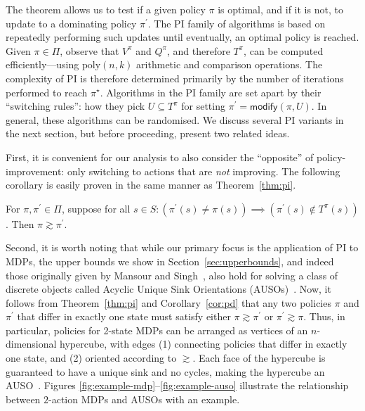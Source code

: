 The theorem allows us to test if a given policy $\pi$ is optimal, and if it is not, to update to a dominating policy $\pi^{\prime}$. The PI family of algorithms is based on repeatedly performing such updates until eventually, an optimal policy is reached. Given $\pi \in \Pi$, observe that $V^{\pi}$ and $Q^{\pi}$, and therefore $T^{\pi}$, can be computed efficiently---using $\text{poly}(n, k)$ arithmetic and comparison operations. The complexity of PI is therefore determined primarily by the number of iterations performed to reach $\pi^{\star}$. Algorithms in the PI family are set apart by their ``switching rules'': how they pick $U \subseteq T^{\pi}$  for setting $\pi^{\prime} = \textsf{modify}(\pi, U)$. In general, these algorithms can be randomised. We discuss several PI variants in the next section, but before proceeding, present two related ideas.

First, it is convenient for our analysis to also consider the ``opposite'' of policy-improvement: only switching to actions that are \textit{not} improving. The following corollary is easily proven in the same manner as Theorem~\ref{thm:pi}.

\begin{corollary}
\label{cor:pd}%
For $\pi, \pi^{\prime} \in \Pi$, suppose for all $s \in S: (\pi^{\prime}(s) \neq \pi(s)) \implies (\pi^{\prime}(s) \notin T^{\pi}(s))$. Then $\pi \gtrsim \pi^{\prime}$.
\end{corollary}

Second, it is worth noting that while our primary focus is the application of PI to MDPs, the upper bounds we show in Section~\ref{sec:upperbounds}, and indeed those originally given by Mansour and Singh~, also hold for solving a class of discrete objects called Acyclic Unique Sink Orientations (AUSOs)~\cite{Stickney+Watson:1978,Szabo+Welzl:2001}. Now, it follows from Theorem~\ref{thm:pi} and Corollary~\ref{cor:pd} that any two policies $\pi$ and $\pi^{\prime}$ that differ in exactly one state must satisfy either $\pi \gtrsim \pi^{\prime}$ or $\pi^{\prime} \gtrsim \pi$. Thus, in particular, policies for 2-state MDPs can be arranged as vertices of an $n$-dimensional hypercube, with edges (1) connecting policies that 
differ in exactly one state, and (2) oriented according to $\gtrsim$. Each face of the hypercube is guaranteed to have a unique sink and no cycles, making the hypercube an AUSO~\cite{Kalyanakrishnan+Gupta}. Figures \ref{fig:example-mdp}--\ref{fig:example-auso} illustrate the relationship between $2$-action MDPs and AUSOs with an example.


